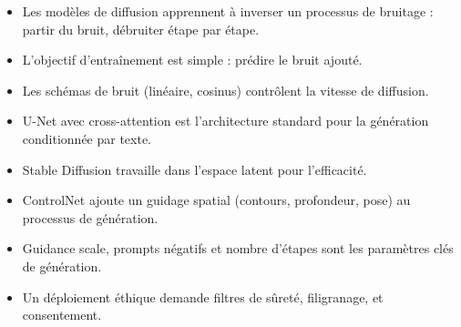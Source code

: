 \begin{itemize}
  \item Les mod\`eles de diffusion apprennent \`a inverser un processus de bruitage : partir du bruit, d\'ebruiter \'etape par \'etape.
  \item L'objectif d'entra\^inement est simple : pr\'edire le bruit ajout\'e.
  \item Les sch\'emas de bruit (lin\'eaire, cosinus) contr\^olent la vitesse de diffusion.
  \item U-Net avec cross-attention est l'architecture standard pour la g\'en\'eration conditionn\'ee par texte.
  \item Stable Diffusion travaille dans l'espace latent pour l'efficacit\'e.
  \item ControlNet ajoute un guidage spatial (contours, profondeur, pose) au processus de g\'en\'eration.
  \item Guidance scale, prompts n\'egatifs et nombre d'\'etapes sont les param\`etres cl\'es de g\'en\'eration.
  \item Un d\'eploiement \'ethique demande filtres de s\^uret\'e, filigranage, et consentement.
\end{itemize}
